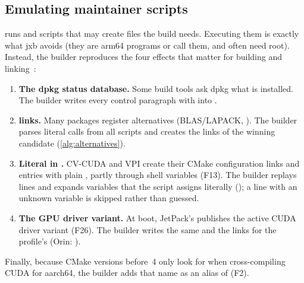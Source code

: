 \documentclass[11pt,a4paper]{article}
\newcommand{\jxb}{\textsf{jxb}}
\newcommand{\finding}[1]{\textsf{\small F#1}}
\begin{document}
\subsection{Emulating maintainer scripts}\label{sec:scripts}
 runs  and  scripts that may create files the build needs. Executing them is
exactly what \jxb{} avoids (they are arm64 programs or call them, and often need root). Instead, the builder
reproduces the four effects that matter for building and linking~\cite{debian-policy}:
\begin{enumerate}
  \item \textbf{The dpkg status database.} Some build tools ask dpkg what is installed. The builder writes every
        control paragraph with  into .
  \item \textbf{ links.} Many  packages register alternatives (BLAS/LAPACK,
        ). The builder parses literal calls
         from all  scripts and
        creates the links of the winning candidate (\cref{alg:alternatives}).
  \item \textbf{Literal  in .} CV-CUDA and VPI create their CMake configuration links and
         entries with plain , partly through shell variables (\finding{13}). The
        builder replays  lines and expands variables that the script assigns literally
        (); a line with an unknown variable is skipped rather than guessed.
  \item \textbf{The GPU driver variant.} At boot, JetPack's  publishes the active CUDA
        driver variant (\finding{26}). The builder writes the same 
        and the  links for the profile's  (Orin: ).
\end{enumerate}
Finally, because CMake versions before~4 only look for  when cross-compiling CUDA for
aarch64, the builder adds that name as an alias of  (\finding{2}).
\end{document}
